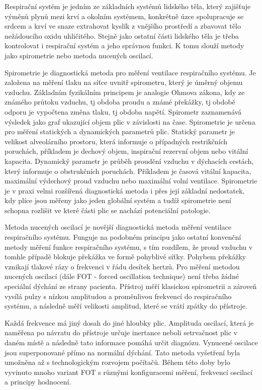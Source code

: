 
Respirační systém je jedním ze základních systémů lidského těla, který zajišťuje výměnů plynů mezi krví a okolním systémem, konkrétně úzce spolupracuje se srdcem a krví ve snaze extrahovat kyslík z vnějšího prostředí a zbavovat tělo nežádoucího oxidu uhličitého. \cite{muni} Stejně jako ostatní části lidského těla je třeba kontrolovat i respirační systém a jeho správnou funkci. K tomu slouží metody jako spirometrie nebo metoda nucených oscilací. 

Spirometrie je diagnostická metoda pro měření ventilace respiračního systému. Je založena na měření tlaku na síťce uvnitř spirometru, který je úměrný objemu vzduchu. \cite{MEFANET} Základním fyzikálním principem je analogie Ohmova zákona, kdy ze známého průtoku vzduchu, tj obdoba proudu a známé překážky, tj obdobě odporu je vypočtena změna tlaku, tj obdoba napětí. Spirometr zaznamenává výsledek jako graf ukazující objem plic v závislosti na čase. \cite{Medicon} Spirometrie je určena pro měření statických a dynamických parametrů plic. Statický parametr  je velikost alveolárního prostoru, která informuje o případných restrikčních poruchách, příkladem je dechový objem, inspirační rezervní objem nebo vitální kapacita. Dynamický parametr je průběh proudění vzduchu v dýchacích cestách, který informuje o obstrukčních poruchách. Příkladem je časová vitální kapacita, maximální výdechový proud vzduchu nebo maximální volní ventilace. \cite{lekfak}
Spirometrie je v praxi velmi rozšířená diagnostická metoda i přes její základní nedostatek, kdy plíce jsou měřeny jako jeden globální systém a tudíž spirometrie není schopna rozlišit ve které části plic se nachází potenciální patologie.

Metoda nucených oscilací je novější diagnostická metoda měření ventilace respiračního systému. Funguje na podobném principu jako ostatní konvenční metody měření funkce respiračního systému, s tím rozdílem, že proud vzduchu v tomhle případě blokuje překážka ve formě pohyblivé síťky. Pohybem překážky vznikají tlakové rázy o frekvenci v řádu desítek hertzů. Pro měření metodou nucených oscilací (dále FOT - forced oscillation technique) není třeba žádné speciální dýchání ze strany pacienta. Přístroj měří klasickou spirometrii a zároveň vysílá pulzy s nízkou amplitudou a proměnlivou frekvencí do respiračního systému, a následně měří velikosti amplitud, které se vrátí zpátky do přístroje. \cite{Oostveen}

Každá frekvence má jiný dosah do jiné hloubky plic. Amplituda oscilací, která je naměřena po návratu do přístroje určuje inertance neboli setrvačnost plic v daném místě a následně tato informace pomáhá určit diagnózu. \cite{Oostveen}
Vynucené oscilace jsou superponované přímo na normální dýchání. Tato metoda vyšetření byla umožněna až s technologickým rozvojem počítačů. \cite{Vlcek2018} Během této doby bylo vyvinuto mnoho variant FOT s různými konfiguracemi měření, frekvencí oscilací a principy hodnocení. 

